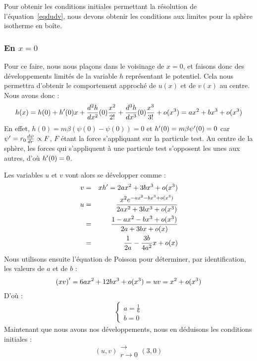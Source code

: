 Pour obtenir les conditions initiales permettant la résolution de l'équation~\ref{eqdudv}, nous devons obtenir les conditions aux limites pour la sphère isotherme en boîte.
\subsubsection{En $x = 0$}
	Pour ce faire, nous nous plaçons dans le voisinage de $x=0$, et faisons donc des développements limités de la variable $h$ représentant le potentiel.
	Cela nous permettra d'obtenir le comportement approché de $u(x)$ et de $v(x)$ au centre.
	Nous avons donc :
	\begin{eqnarray*}
		h(x) = h(0) + h'(0)x + \frac{d^2 h}{dx^2}(0)\frac{x^2}{2!} + \frac{d^3 h}{dx^3}(0)\frac{x^3}{3!} + o(x^3) = ax^2 + bx^3 + o(x^3)
	\end{eqnarray*}
	En effet, \mbox{$h(0) = m\beta\left(\psi(0) - \psi(0)\right) = 0$} et \mbox{$h'(0) = m\beta\psi'(0) = 0$} car \mbox{$\psi' = r_0\frac{d \psi}{dr}\propto F$},
	$F$ étant la force s'appliquant sur la particule test.
	Au centre de la sphère, les forces qui s'appliquent à une particule test s'opposent les unes aux autres, d'où $h'(0) = 0$.

	Les variables $u$ et $v$ vont alors se développer comme :
	\begin{eqnarray}
		v &=& xh' = 2ax^2 + 3bx^3 + o(x^3)\label{vDL} \\
		u &=& \frac{x^2e^{-ax^2 - bx^3 + o(x^3)}}{2ax^2 + 3bx^3 + o(x^3)} \\
		  &=& \frac{1 - ax^2 - bx^3 + o(x^3)}{2a + 3bx +o(x)} \\
		  &=& \frac{1}{2a} - \frac{3b}{4a^2}x + o(x)\label{uDL}
	\end{eqnarray}
	Nous utilisons ensuite l'équation de Poisson pour déterminer, par identification, les valeurs de $a$ et de $b$ :
	\begin{eqnarray}
		\left(xv\right)' = 6ax^2 + 12bx^3 + o(x^3) = uv = x^2 + o(x^3)\label{PoisDL}
	\end{eqnarray}
	D'où :
	\begin{eqnarray}
		\left\{\begin{array}{l}
			a = \frac{1}{6} \\
			b = 0
		\end{array}\right.
	\end{eqnarray}
	Maintenant que nous avons nos développements, nous en déduisons les conditions initiales :
	$$(u,v) \substack{\longrightarrow \\ r\to 0} (3,0)$$

